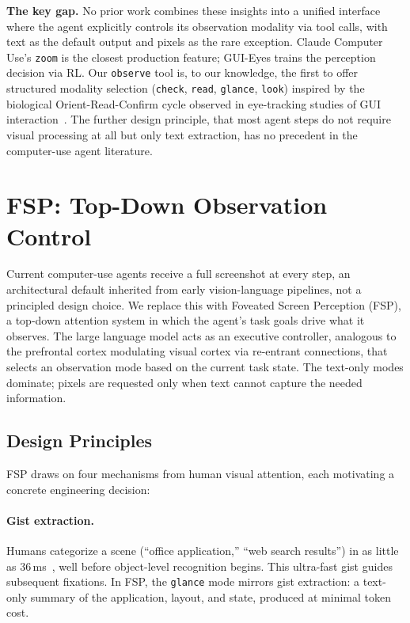 \documentclass[11pt,a4paper]{article}
\begin{document}
\textbf{The key gap.} No prior work combines these insights into a unified interface where the agent explicitly controls its observation modality via tool calls, with text as the default output and pixels as the rare exception. Claude Computer Use's \texttt{zoom} is the closest production feature; GUI-Eyes trains the perception decision via RL. Our \texttt{observe} tool is, to our knowledge, the first to offer structured modality selection (\texttt{check}, \texttt{read}, \texttt{glance}, \texttt{look}) inspired by the biological Orient-Read-Confirm cycle observed in eye-tracking studies of GUI interaction~\cite{gui-eye-tracking}. The further design principle, that most agent steps do not require visual processing at all but only text extraction, has no precedent in the computer-use agent literature.



\section{FSP: Top-Down Observation Control}
\label{sec:method}

Current computer-use agents receive a full screenshot at every step, an
architectural default inherited from early vision-language pipelines, not a
principled design choice. We replace this with Foveated Screen
Perception (FSP), a top-down attention system in which the agent's task goals
drive what it observes. The large language model acts as an executive
controller, analogous to the prefrontal cortex modulating visual cortex via
re-entrant connections, that selects an observation mode based on the current
task state. The text-only modes dominate; pixels are requested only when
text cannot capture the needed information.

\subsection{Design Principles}
\label{sec:design-principles}

FSP draws on four mechanisms from human visual attention, each motivating a
concrete engineering decision:

\paragraph{Gist extraction.}
Humans categorize a scene (``office application,'' ``web search results'') in
as little as 36\,ms~\cite{greene2009recognition,thorpe1996speed}, well before
object-level recognition begins. This ultra-fast gist guides subsequent
fixations. In FSP, the \texttt{glance} mode mirrors gist extraction: a
text-only summary of the application, layout, and state, produced at minimal
token cost.
\end{document}
